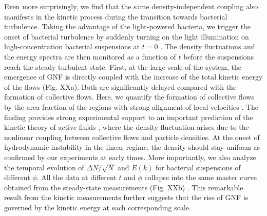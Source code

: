 \documentclass[twocolumn,aps,prl,amsmath,amssymb,longbibliography]{revtex4-2}
\begin{document}
Even more surprisingly, we find that the same density-independent coupling also manifests in the kinetic process during the transition towards bacterial turbulence. Taking the advantage of the light-powered bacteria, we trigger the onset of bacterial turbulence by suddenly turning on the light illumination on high-concentration bacterial suspensions at $t=0$ \cite{Peng2020}. The density fluctuations and the energy spectra are then monitored as a function of $t$ before the suspensions reach the steady turbulent state. First, at the large scale of the system, the emergence of GNF is directly coupled with the increase of the total kinetic energy of the flows (Fig. XXa). Both are significantly delayed compared with the formation of collective flows. Here, we quantify the formation of collective flows by the area fraction of the regions with strong alignment of local velocities \cite{Liu2020,Peng2020}. The finding provides strong experimental support to an important prediction of the kinetic theory of active fluids \cite{Saintillan2008a,Saintillan2008b}, where the density fluctuation arises due to the nonlinear coupling between collective flows and particle densities. At the onset of hydrodynamic instability in the linear regime, the density should stay uniform as confirmed by our experiments at early times.
More importantly, we also analyze the temporal evolution of $\Delta N/\sqrt N$ and $E(k)$ for bacterial suspensions of different $\phi$. All the data at different $t$ and $\phi$ collapse into the same master curve obtained from the steady-state measurements (Fig. XXb) \cite{Liu2020}.
This remarkable result from the kinetic measurements further suggests that the rise of GNF is governed by the kinetic energy at each corresponding scale.
\end{document}
